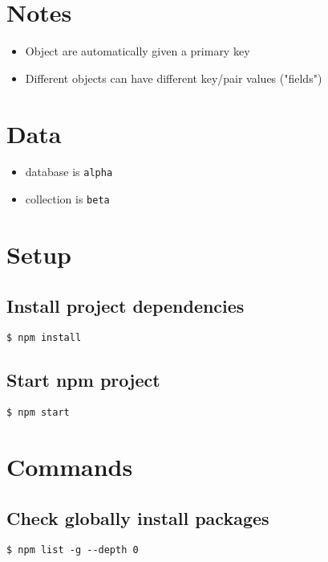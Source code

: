 \documentclass{article}
\title{\vspace{-2.25cm}{\small NPM}\vspace{-1.5cm}}
\date{}
\begin{document}
\maketitle
\begin{multicols}{3}
\section{Notes}
\begin{itemize}
\item Object are automatically given a primary key
\item Different objects can have different key/pair values ("fields")
\end{itemize}
\section{Data}
\begin{itemize}
\item database is \texttt{alpha}
\item collection is \texttt{beta}
\end{itemize}
\section{Setup}
\subsection{Install project dependencies}
\lstinline|$ npm install|
\subsection{Start npm project}
\lstinline|$ npm start|
\section{Commands}
\subsection{Check globally install packages}
\lstinline|$ npm list -g --depth 0|
\end{multicols}
\end{document}
